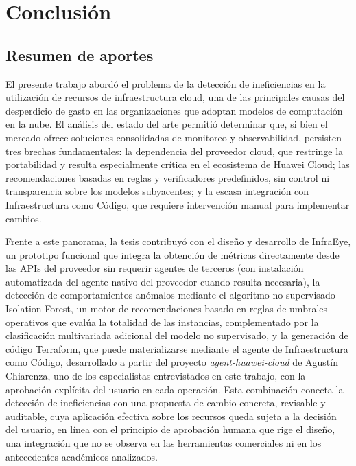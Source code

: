 \chapter{Conclusi\'on}\label{conclussions}

\section{Resumen de aportes}

El presente trabajo abordó el problema de la detección de ineficiencias en la utilización de recursos de infraestructura cloud, una de las principales causas del desperdicio de gasto en las organizaciones que adoptan modelos de computación en la nube. El análisis del estado del arte permitió determinar que, si bien el mercado ofrece soluciones consolidadas de monitoreo y observabilidad, persisten tres brechas fundamentales: la dependencia del proveedor cloud, que restringe la portabilidad y resulta especialmente crítica en el ecosistema de Huawei Cloud; las recomendaciones basadas en reglas y verificadores predefinidos, sin control ni transparencia sobre los modelos subyacentes; y la escasa integración con Infraestructura como Código, que requiere intervención manual para implementar cambios.

Frente a este panorama, la tesis contribuyó con el diseño y desarrollo de InfraEye, un prototipo funcional que integra la obtención de métricas directamente desde las APIs del proveedor sin requerir agentes de terceros (con instalación automatizada del agente nativo del proveedor cuando resulta necesaria), la detección de comportamientos anómalos mediante el algoritmo no supervisado Isolation Forest, un motor de recomendaciones basado en reglas de umbrales operativos que evalúa la totalidad de las instancias, complementado por la clasificación multivariada adicional del modelo no supervisado, y la generación de código Terraform, que puede materializarse mediante el agente de Infraestructura como Código, desarrollado a partir del proyecto \emph{agent-huawei-cloud} de Agustín Chiarenza, uno de los especialistas entrevistados en este trabajo, con la aprobación explícita del usuario en cada operación. Esta combinación conecta la detección de ineficiencias con una propuesta de cambio concreta, revisable y auditable, cuya aplicación efectiva sobre los recursos queda sujeta a la decisión del usuario, en línea con el principio de aprobación humana que rige el diseño, una integración que no se observa en las herramientas comerciales ni en los antecedentes académicos analizados.

